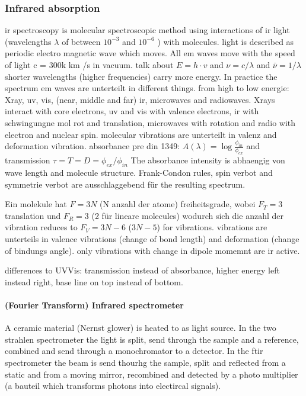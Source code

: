 \subsubsection{Infrared absorption}
\Gls{ir} spectroscopy is molecular spectroscopic method using interactions of \gls{ir} light (wavelengths $\lambda$ of between $10^{-3}$ and $10^{-6}$ \nm{}) with molecules. \cite{Schwedt2008}
light is described as periodic electro magnetic wave which moves. 
All \gls{em} waves move with the speed of light c = 300k km /s in vacuum. 
talk about $E=h\cdot v$ and $\nu=c/\lambda$ and $\bar{\nu}=1/\lambda$
shorter wavelengths (higher frequencies) carry more energy. 
In practice the spectrum \gls{em} waves are unterteilt in different things. 
from high to low energie: Xray, \gls{uv}, vis, (near, middle and far) \gls{ir}, microwaves and radiowaves. 
Xrays interact with core electrons, \gls{uv} and vis with valence electrons, ir with schwingungne mol rot and translation, microwaves with rotation and radio with electron and nuclear spin. 
molecular vibrations are unterteilt in valenz and deformation vibration.
absorbance pre din 1349: $A(\lambda) = \log{\frac{\phi_{in}}{\phi_{ex}}}$ and transmission $\tau =T=D= \phi_{ex}/\phi_{in}$
The absorbance intensity is abhaengig von wave length and molecule structure. 
Frank-Condon rules, spin verbot and symmetrie verbot are ausschlaggebend für the resulting spectrum. 

Ein molekule hat $F=3N$ (N anzahl der atome) freiheitsgrade, wobei $F_T=3$ translation und $F_R=3$ (2 für lineare molecules) wodurch sich die anzahl der vibration reduces to $F_V=3N-6$ ($3N-5$) for vibrations. 
vibrations are unterteils in valence vibrations (change of bond length) and deformation (change of bindungs angle). 
only vibrations with change in dipole momemnt are \gls{ir} active. 

differences to UVVis: transmission instead of absorbance, higher energy left instead right, base line on top instead of bottom.
\paragraph{(Fourier Transform) Infrared spectrometer}
 A ceramic material (Nernst glower) is heated to  as light source. 
 In the two strahlen spectrometer the light is split, send through the sample and a reference, combined and send through a monochromator to a detector. 
 In the \gls{ft}\gls{ir} spectrometer the beam is send thourhg the sample, split and reflected from a static and from a moving mirror, recombined and detected by a photo multiplier (a bauteil which transforms photons into electircal signals).


